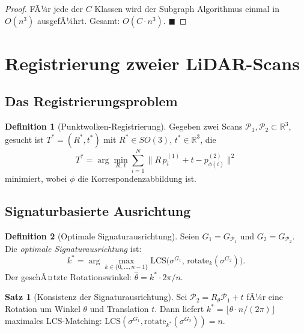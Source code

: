 ﻿\documentclass[a4paper,12pt]{article}
\theoremstyle{definition}
\newtheorem{definition}{Definition}[section]
\newtheorem{satz}{Satz}[section]
\begin{document}
\begin{proof}
  FÃ¼r jede der $C$ Klassen wird der Subgraph Algorithmus einmal in
  $O(n^3)$ ausgefÃ¼hrt. Gesamt: $O(C \cdot n^3)$. \hfill$\blacksquare$
\end{proof}

\section{Registrierung zweier LiDAR-Scans}

\subsection{Das Registrierungsproblem}

\begin{definition}[Punktwolken-Registrierung]
  \label{def:registrierung}
  Gegeben zwei Scans $\mathcal{P}_1, \mathcal{P}_2 \subset
  \mathbb{R}^3$, gesucht ist $T^* = (R^*, t^*)$ mit $R^* \in SO(3)$,
  $t^* \in \mathbb{R}^3$, die
  \[
    T^* = \arg\min_{R,\, t} \sum_{i=1}^{N}
          \bigl\|R\,p_i^{(1)} + t - p_{\phi(i)}^{(2)}\bigr\|^2
  \]
  minimiert, wobei $\phi$ die Korrespondenzabbildung ist.
\end{definition}

\subsection{Signaturbasierte Ausrichtung}

\begin{definition}[Optimale Signaturausrichtung]
  \label{def:sig_ausrichtung}
  Seien $G_1 = G_{\mathcal{P}_1}$ und $G_2 = G_{\mathcal{P}_2}$.
  Die \emph{optimale Signaturausrichtung} ist:
  \[
    k^* = \arg\max_{k \in \{0,\ldots,n-1\}}
          \mathrm{LCS}\!\bigl(\sigma^{G_1},\,
          \mathrm{rotate}_k(\sigma^{G_2})\bigr).
  \]
  Der geschÃ¤tzte Rotationswinkel: $\hat\theta = k^* \cdot 2\pi / n$.
\end{definition}

\begin{satz}[Konsistenz der Signaturausrichtung]
  \label{satz:reg_konsistenz}
  Sei $\mathcal{P}_2 = R_\theta \mathcal{P}_1 + t$ fÃ¼r eine
  Rotation um Winkel $\theta$ und Translation $t$.
  Dann liefert $k^* = \lfloor \theta \cdot n / (2\pi) \rfloor$
  maximales LCS-Matching: $\mathrm{LCS}(\sigma^{G_1},
  \mathrm{rotate}_{k^*}(\sigma^{G_2})) = n$.
\end{satz}
\end{document}
